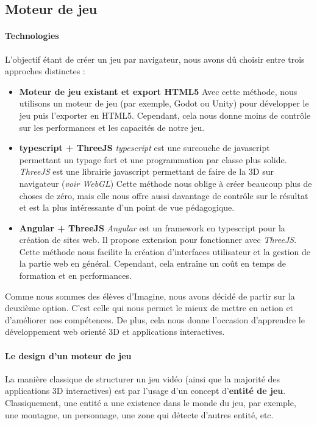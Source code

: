 \subsection{Moteur de jeu}

\paragraph{Technologies}
    L'objectif étant de créer un jeu  par navigateur, nous avons dû choisir entre trois approches distinctes :
    \begin{itemize}
        \item \textbf{Moteur de jeu existant et export HTML5} \newline Avec cette méthode, nous utilisons un moteur de jeu (par exemple, Godot ou Unity) pour développer le jeu puis l'exporter en HTML5. Cependant, cela nous donne moins de contrôle sur les performances et les capacités de notre jeu.
        \item \textbf{typescript + ThreeJS} \newline \textit{typescript} est une surcouche de javascript permettant un typage fort et une programmation par classe plus solide. \textit{ThreeJS} est une librairie javascript permettant de faire de la 3D sur navigateur (\textit{voir WebGL}) Cette méthode nous oblige à créer beaucoup plus de choses de zéro, mais elle nous offre aussi davantage de contrôle sur le résultat et est la plus intéressante d'un point de vue pédagogique.
        \item \textbf{Angular + ThreeJS} \newline \textit{Angular} est un framework en typescript pour la création de sites web. Il propose extension pour fonctionner avec \textit{ThreeJS}. Cette méthode nous facilite la création d'interfaces utilisateur et la gestion de la partie web en général. Cependant, cela entraîne un coût en temps de formation et en performances.
    \end{itemize}

    Comme nous sommes des élèves d'Imagine, nous avons décidé de partir sur la deuxième option. C'est celle qui nous permet le mieux de mettre en action et d'améliorer nos compétences. De plus, cela nous donne l'occasion d'apprendre le développement web orienté 3D et applications interactives.
    
\paragraph{Le design d'un moteur de jeu}
    La manière classique de structurer un jeu vidéo (ainsi que la majorité des applications 3D interactives) est par l'usage d'un concept d'\textbf{entité de jeu}. Classiquement, une entité a une existence dans le monde du jeu, par exemple, une montagne, un personnage, une zone qui détecte d'autres entité, etc.
    
